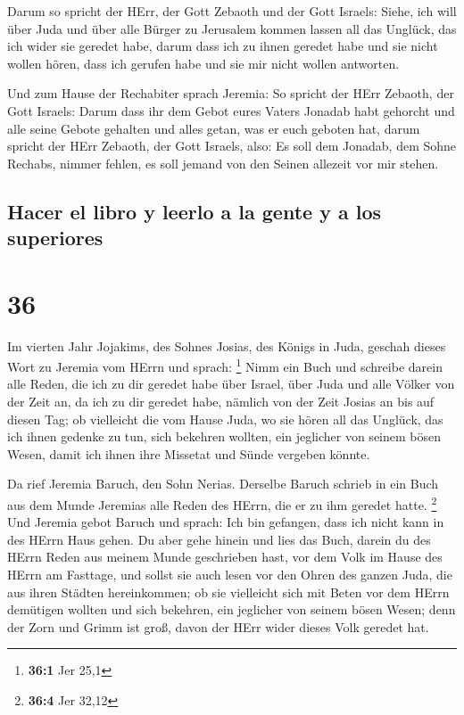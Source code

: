  Darum so spricht der HErr, der Gott Zebaoth und der Gott
Israels: Siehe, ich will über Juda und über alle Bürger zu Jerusalem
kommen lassen all das Unglück, das ich wider sie geredet habe, darum
dass ich zu ihnen geredet habe und sie nicht wollen hören, dass ich
gerufen habe und sie mir nicht wollen antworten.

 Und zum Hause der Rechabiter sprach Jeremia: So spricht
der HErr Zebaoth, der Gott Israels: Darum dass ihr dem Gebot eures
Vaters Jonadab habt gehorcht und alle seine Gebote gehalten und alles
getan, was er euch geboten hat,  darum spricht der HErr
Zebaoth, der Gott Israels, also: Es soll dem Jonadab, dem Sohne Rechabs,
nimmer fehlen, es soll jemand von den Seinen allezeit vor mir stehen.

\hypertarget{hacer-el-libro-y-leerlo-a-la-gente-y-a-los-superiores}{%
\subsection{Hacer el libro y leerlo a la gente y a los
superiores}\label{hacer-el-libro-y-leerlo-a-la-gente-y-a-los-superiores}}

\hypertarget{section-35}{%
\section{36}\label{section-35}}

 Im vierten Jahr Jojakims, des Sohnes Josias, des Königs
in Juda, geschah dieses Wort zu Jeremia vom HErrn und sprach:
\footnote{\textbf{36:1} Jer 25,1}  Nimm ein Buch und
schreibe darein alle Reden, die ich zu dir geredet habe über Israel,
über Juda und alle Völker von der Zeit an, da ich zu dir geredet habe,
nämlich von der Zeit Josias an bis auf diesen Tag;  ob
vielleicht die vom Hause Juda, wo sie hören all das Unglück, das ich
ihnen gedenke zu tun, sich bekehren wollten, ein jeglicher von seinem
bösen Wesen, damit ich ihnen ihre Missetat und Sünde vergeben könnte.

 Da rief Jeremia Baruch, den Sohn Nerias. Derselbe Baruch
schrieb in ein Buch aus dem Munde Jeremias alle Reden des HErrn, die er
zu ihm geredet hatte. \footnote{\textbf{36:4} Jer 32,12} 
Und Jeremia gebot Baruch und sprach: Ich bin gefangen, dass ich nicht
kann in des HErrn Haus gehen.  Du aber gehe hinein und
lies das Buch, darein du des HErrn Reden aus meinem Munde geschrieben
hast, vor dem Volk im Hause des HErrn am Fasttage, und sollst sie auch
lesen vor den Ohren des ganzen Juda, die aus ihren Städten hereinkommen;
 ob sie vielleicht sich mit Beten vor dem HErrn demütigen
wollten und sich bekehren, ein jeglicher von seinem bösen Wesen; denn
der Zorn und Grimm ist groß, davon der HErr wider dieses Volk geredet
hat.

